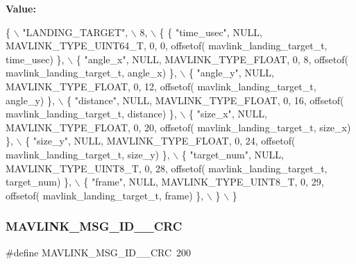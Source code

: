 {\bfseries Value\+:}
\begin{DoxyCode}
\{ \(\backslash\)
    \textcolor{stringliteral}{"LANDING\_TARGET"}, \(\backslash\)
    8, \(\backslash\)
    \{  \{ \textcolor{stringliteral}{"time\_usec"}, NULL, MAVLINK_TYPE_UINT64_T, 0, 0, offsetof(
      mavlink_landing_target_t, time\_usec) \}, \(\backslash\)
         \{ \textcolor{stringliteral}{"angle\_x"}, NULL, MAVLINK_TYPE_FLOAT, 0, 8, offsetof(
      mavlink_landing_target_t, angle\_x) \}, \(\backslash\)
         \{ \textcolor{stringliteral}{"angle\_y"}, NULL, MAVLINK_TYPE_FLOAT, 0, 12, offsetof(
      mavlink_landing_target_t, angle\_y) \}, \(\backslash\)
         \{ \textcolor{stringliteral}{"distance"}, NULL, MAVLINK_TYPE_FLOAT, 0, 16, offsetof(
      mavlink_landing_target_t, distance) \}, \(\backslash\)
         \{ \textcolor{stringliteral}{"size\_x"}, NULL, MAVLINK_TYPE_FLOAT, 0, 20, offsetof(
      mavlink_landing_target_t, size\_x) \}, \(\backslash\)
         \{ \textcolor{stringliteral}{"size\_y"}, NULL, MAVLINK_TYPE_FLOAT, 0, 24, offsetof(
      mavlink_landing_target_t, size\_y) \}, \(\backslash\)
         \{ \textcolor{stringliteral}{"target\_num"}, NULL, MAVLINK_TYPE_UINT8_T, 0, 28, offsetof(
      mavlink_landing_target_t, target\_num) \}, \(\backslash\)
         \{ \textcolor{stringliteral}{"frame"}, NULL, MAVLINK_TYPE_UINT8_T, 0, 29, offsetof(
      mavlink_landing_target_t, frame) \}, \(\backslash\)
         \} \(\backslash\)
\}
\end{DoxyCode}
\mbox{\label{mavlink__msg__landing__target_8h_af997f03112686bbee9da5a3dba2effa6}} 
\subsubsection{M\+A\+V\+L\+I\+N\+K\+\_\+\+M\+S\+G\+\_\+\+I\+D\+\_\+\_\+\+C\+RC}
{\footnotesize\ttfamily \#define M\+A\+V\+L\+I\+N\+K\+\_\+\+M\+S\+G\+\_\+\+I\+D\+\_\+\_\+\+C\+RC~200}

\mbox{\label{mavlink__msg__landing__target_8h_a0cb9a9b54a7c151adddd1de521cff9be}} 
